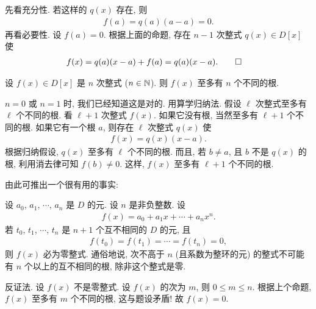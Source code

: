 \begin{pf}
    先看充分性. 若这样的 $q(x)$ 存在, 则
    \begin{align*}
        f(a) = q(a) (a-a) = 0.
    \end{align*}
    再看必要性. 设 $f(a)=0$. 根据上面的命题, 存在 $n-1$ 次整式 $q(x) \in D[x]$ 使
    \begin{align*}
         & f(x) = q(a) (x-a) + f(a) = q(a) (x-a). \qedhere
    \end{align*}
\end{pf}

\begin{proposition}
    设 $f(x) \in D[x]$ 是 $n$ 次整式 ($n \in \mathbb{N}$). 则 $f(x)$ 至多有 $n$ 个不同的根.
\end{proposition}

\begin{pf}
    $n = 0$ 或 $n = 1$ 时, 我们已经知道这是对的. 用算学归纳法. 假设 $\ell$ 次整式至多有 $\ell$ 个不同的根. 看 $\ell + 1$ 次整式 $f(x)$. 如果它没有根, 当然至多有 $\ell + 1$ 个不同的根. 如果它有一个根 $a$, 则存在 $\ell$ 次整式 $q(x)$ 使
    \begin{align*}
        f(x) = q(x) (x-a).
    \end{align*}
    根据归纳假设, $q(x)$ 至多有 $\ell$ 个不同的根. 而且, 若 $b \neq a$, 且 $b$ 不是 $q(x)$ 的根, 利用消去律可知 $f(b) \neq 0$. 这样, $f(x)$ 至多有 $\ell + 1$ 个不同的根.
\end{pf}

由此可推出一个很有用的事实:

\begin{proposition}
    设 $a_0$, $a_1$, $\cdots$, $a_n$ 是 $D$ 的元. 设 $n$ 是非负整数. 设
    \begin{align*}
        f(x) = a_0 + a_1 x + \cdots + a_n x^n.
    \end{align*}
    若 $t_0$, $t_1$, $\cdots$, $t_n$ 是 $n+1$ 个互不相同的 $D$ 的元, 且
    \begin{align*}
        f(t_0) = f(t_1) = \cdots = f(t_n) = 0,
    \end{align*}
    则 $f(x)$ 必为零整式. 通俗地说, 次不高于 $n$ (且系数为整环的元) 的整式不可能有 $n$ 个以上的互不相同的根, 除非这个整式是零.
\end{proposition}

\begin{pf}
    反证法. 设 $f(x)$ 不是零整式. 设 $f(x)$ 的次为 $m$, 则 $0 \leq m \leq n$. 根据上个命题, $f(x)$ 至多有 $m$ 个不同的根, 这与题设矛盾! 故 $f(x) = 0$.
\end{pf}

